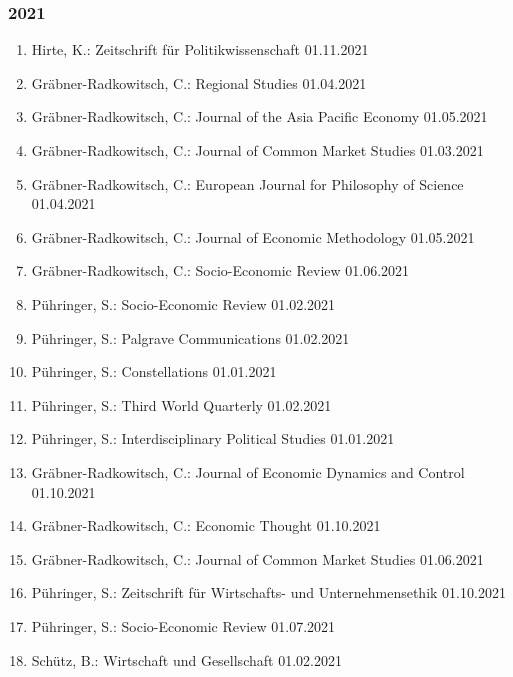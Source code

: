 \subsubsection*{2021}
\begin{enumerate}
	\item Hirte, K.: Zeitschrift für Politikwissenschaft 01.11.2021
	\item Gräbner-Radkowitsch, C.: Regional Studies 01.04.2021
	\item Gräbner-Radkowitsch, C.: Journal of the Asia Pacific Economy 01.05.2021
	\item Gräbner-Radkowitsch, C.: Journal of Common Market Studies 01.03.2021
	\item Gräbner-Radkowitsch, C.: European Journal for Philosophy of Science 01.04.2021
	\item Gräbner-Radkowitsch, C.: Journal of Economic Methodology 01.05.2021
	\item Gräbner-Radkowitsch, C.: Socio-Economic Review 01.06.2021
	\item Pühringer, S.: Socio-Economic Review 01.02.2021
	\item Pühringer, S.: Palgrave Communications 01.02.2021
	\item Pühringer, S.: Constellations 01.01.2021
	\item Pühringer, S.: Third World Quarterly 01.02.2021
	\item Pühringer, S.: Interdisciplinary Political Studies 01.01.2021
	\item Gräbner-Radkowitsch, C.: Journal of Economic Dynamics and Control 01.10.2021
	\item Gräbner-Radkowitsch, C.: Economic Thought 01.10.2021
	\item Gräbner-Radkowitsch, C.: Journal of Common Market Studies 01.06.2021
	\item Pühringer, S.: Zeitschrift für Wirtschafts- und Unternehmensethik 01.10.2021
	\item Pühringer, S.: Socio-Economic Review 01.07.2021
	\item Schütz, B.: Wirtschaft und Gesellschaft 01.02.2021
\end{enumerate}
